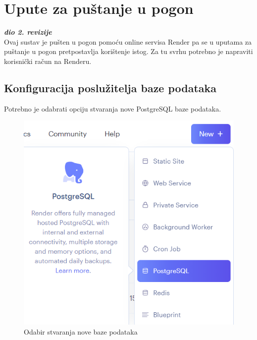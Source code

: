 			\eject 
		
		\section{Upute za puštanje u pogon}
		
			\textbf{\textit{dio 2. revizije}}\\
			
			Ovaj sustav je pušten u pogon pomoću online servisa Render pa se u uputama za puštanje u pogon pretpostavlja korištenje istog. Za tu svrhu potrebno je napraviti korisnički račun na Renderu. 
			
			\subsection{Konfiguracija poslužitelja baze podataka}
			
			Potrebno je odabrati opciju stvaranja nove PostgreSQL baze podataka.
			
			\begin{figure}[H]
				\includegraphics[scale=0.8]{slike/upute/odabirStvaranjaBaze.png} %
				\centering
				\caption{Odabir stvaranja nove baze podataka}
				\label{fig:odabirStvaranjaBaze} %
			\end{figure}
			
